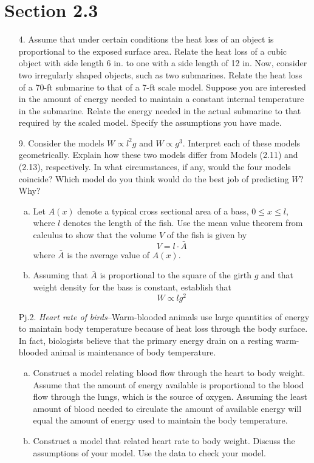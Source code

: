 \documentclass[10pt]{report}
\begin{document}
\section*{Section 2.3}
\begin{enumerate}
	\item [4.]
	Assume that under certain conditions the heat loss of an object is proportional to the exposed surface area. Relate the heat loss of a cubic object with side length 6 in. to one with a side length of 12 in. Now, consider two irregularly shaped objects, such as two submarines. Relate the heat loss of a 70-ft submarine to that of a 7-ft scale model. Suppose you are interested in the amount of energy needed to maintain a constant internal temperature in the submarine. Relate the energy needed in the actual submarine to that required by the scaled model. Specify the assumptions you have made.
	
	\item [9.]
	Consider the models $W\propto l^2 g$ and $W\propto g^3$. Interpret each of these models geometrically. Explain how these two models differ from Models (2.11) and (2.13), respectively. In what circumstances, if any, would the four models coincide? Which model do you think would do the best job of predicting $W$? Why? 
	\begin{enumerate}[a.]
		\item 
		Let $A(x)$ denote a typical cross sectional area of a bass, $0\le x \le l$, where $l$ denotes the length of the fish. Use the mean value theorem from calculus to show that the volume $V$ of the fish is given by
		\[
		V = l \cdot \bar{A}
		\]
		where $\bar{A}$ is the average value of $A(x)$.
		
		\item 
		Assuming that $\bar{A}$ is proportional to the square of the girth $g$ and that weight density for the bass is constant, establish that
		\[
		W\propto l g^2
		\]
	\end{enumerate}

	\item [Pj.2.]
	\textit{Heart rate of birds}--Warm-blooded animals use large quantities of energy to maintain body temperature because of heat loss through the body surface. In fact, biologists believe that the primary energy drain on a resting warm-blooded animal is maintenance of body temperature.
	\begin{enumerate}[a.]
		\item 
		Construct a model relating blood flow through the heart to body weight. Assume that the amount of energy available is proportional to the blood flow through the lungs, which is the source of oxygen. Assuming the least amount of blood needed to circulate the amount of available energy will equal the amount of energy used to maintain the body temperature.
		
		\item 
		Construct a model that related heart rate to body weight. Discuss the assumptions of your model. Use the data to check your model.
	\end{enumerate}
\end{enumerate}
\end{document}
